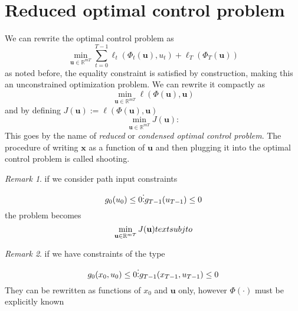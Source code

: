 \documentclass{book}
\newcommand{\R}{\mathbb{R}}
\theoremstyle{definition}
\theoremstyle{remark}
\newtheorem*{remark}{Remark}
\theoremstyle{remark}
\begin{document}
\section{Reduced optimal control problem}
We can rewrite the optimal control problem as 
\[
    \min_{\mathbf{u}\in\R^{mT}} \displaystyle\sum_{t=0}^{T-1}\ell_t(\Phi_t(\mathbf{u}),u_t)+\ell_T(\Phi_T(\mathbf{u}))
\]
as noted before, the equality constraint is satisfied by construction, making this an unconstrained optimization problem. We can rewrite it compactly as 
\[
    \min_{\mathbf{u}\in\R^{mT}}\ell(\Phi(\mathbf{u}),\mathbf{u})
\]
and by defining $J(\mathbf{u}):=\ell(\Phi(\mathbf{u}),\mathbf{u})$
\[
    \min_{\mathbf{u}\in\R^{mT}} J(\mathbf{u}):
\]
This goes by the name of \emph{reduced} or \emph{condensed optimal control problem}. The procedure of writing $\mathbf{x}$ as a function of $\mathbf{u}$ and then plugging it into the optimal control problem is called shooting.
\begin{remark}
    if we consider path input constraints 
    \[
        g_0(u_0)\leq 0 \\
        \vdots \\
        g_{T-1}(u_{T-1})\leq 0 \\
    \]
    the problem becomes 
    \[
        \min_{\mathbf{u}\in\R^{mT}} J(\mathbf{u}) \\
        text{subj to}
    \]
\end{remark}
\begin{remark}
     if we have constraints of the type 
     \[
        g_0(x_0,u_0)\leq 0\\
        \vdots \\
        g_{T-1}(x_{T-1},u_{T-1})\leq 0\\
     \]
     They can be rewritten as functions of $x_0$ and $\mathbf{u}$ only, however $\Phi(\cdot)$ must be explicitly known
\end{remark}
\end{document}

